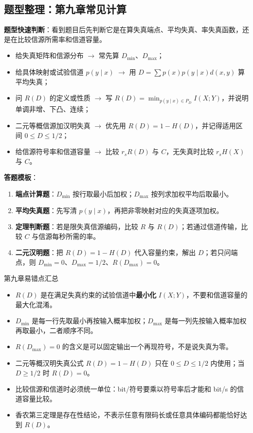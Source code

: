 \subsection{题型整理：第九章常见计算}

\textbf{题型快速判断}：看到题目后先判断它是在算失真端点、平均失真、率失真函数，还是在比较信源所需率和信道容量。
\begin{itemize}
  \item 给失真矩阵和信源分布 $\to$ 常先算 $D_{\min}$、$D_{\max}$；
  \item 给具体映射或试验信道 $p(y\mid x)$ $\to$ 用 $D=\sum p(x)p(y\mid x)d(x,y)$ 算平均失真；
  \item 问 $R(D)$ 的定义或性质 $\to$ 写 $R(D)=\min_{p(y\mid x)\in P_D}I(X;Y)$，并说明单调非增、下凸、连续；
  \item 二元等概信源加汉明失真 $\to$ 优先用 $R(D)=1-H(D)$，并记得适用区间 $0\le D\le1/2$；
  \item 给信源符号率和信道容量 $\to$ 比较 $r_sR(D)$ 与 $C$，无失真时比较 $r_sH(X)$ 与 $C$。
\end{itemize}

\textbf{答题模板}：
\begin{enumerate}
  \item \textbf{端点计算题}：$D_{\min}$ 按行取最小后加权；$D_{\max}$ 按列求加权平均后取最小。
  \item \textbf{平均失真题}：先写清 $p(y\mid x)$，再把非零映射对应的失真逐项加权。
  \item \textbf{定理判断题}：若是限失真信源编码，比较 $R$ 与 $R(D)$；若通过信道传输，比较 $C$ 与信源每秒所需的率。
  \item \textbf{二元汉明题}：把 $R(D)=1-H(D)$ 代入容量约束，解出 $D$；若只问端点，则 $D_{\min}=0$、$D_{\max}=1/2$、$R(D_{\max})=0$。
\end{enumerate}

\begin{warningBox}{第九章易错点汇总}
\begin{itemize}
  \item $R(D)$ 是在满足失真约束的试验信道中\textbf{最小化} $I(X;Y)$，不要和信道容量的最大化混淆。
  \item $D_{\min}$ 是每一行先取最小再按输入概率加权；$D_{\max}$ 是每一列先按输入概率加权再取最小，二者顺序不同。
  \item $R(D_{\max})=0$ 的含义是可以固定输出一个再现符号，不是说失真为零。
  \item 二元等概汉明失真公式 $R(D)=1-H(D)$ 只在 $0\le D\le1/2$ 内使用；当 $D\ge1/2$ 时 $R(D)=0$。
  \item 比较信源和信道时必须统一单位：bit/符号要乘以符号率后才能和 bit/s 的信道容量比较。
  \item 香农第三定理是存在性结论，不表示任意有限码长或任意具体编码都能恰好达到 $R(D)$。
\end{itemize}
\end{warningBox}

